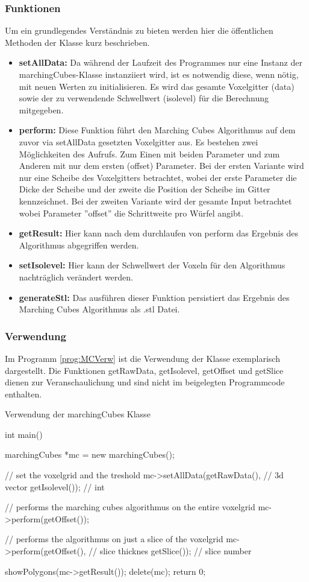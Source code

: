 \subsubsection{Funktionen}
Um ein grundlegendes Verständnis zu bieten werden hier die öffentlichen Methoden der Klasse kurz beschrieben. \\
\begin{itemize}
	\item \textbf{setAllData:} Da während der Laufzeit des Programmes nur eine Instanz der marchingCubes-Klasse instanziiert wird, ist es notwendig diese, wenn nötig, mit neuen Werten zu initialisieren. Es wird das gesamte Voxelgitter (data) sowie der zu verwendende Schwellwert (isolevel) für die Berechnung mitgegeben.
	\item \textbf{perform:} Diese Funktion führt den Marching Cubes Algorithmus auf dem zuvor via setAllData gesetzten Voxelgitter aus. Es bestehen zwei Möglichkeiten des Aufrufs. Zum Einen mit beiden Parameter und zum Anderen mit nur dem ersten (offset) Parameter. Bei der ersten Variante wird nur eine Scheibe des Voxelgitters betrachtet, wobei der erste Parameter die Dicke der Scheibe und der zweite die Position der Scheibe im Gitter kennzeichnet. Bei der zweiten Variante wird der gesamte Input betrachtet wobei Parameter ''offset'' die Schrittweite pro Würfel angibt. 
	\item \textbf{getResult:} Hier kann nach dem durchlaufen von perform das Ergebnis des Algorithmus abgegriffen werden. 
	\item \textbf{setIsolevel:} Hier kann der Schwellwert der Voxeln für den Algorithmus nachträglich verändert werden.
	\item \textbf{generateStl:} Das ausführen dieser Funktion persistiert das Ergebnis des Marching Cubes Algorithmus als .stl Datei.
\end{itemize}
\subsubsection{Verwendung}
Im Programm \ref{prog:MCVerw} ist die Verwendung der Klasse exemplarisch dargestellt. Die Funktionen getRawData, getIsolevel, getOffset und getSlice dienen zur Veranschaulichung und sind nicht im beigelegten Programmcode enthalten. 
\begin{program}[H]
	\caption{Verwendung der marchingCubes Klasse}
	\label{prog:MCVerw}
	\begin{CCode}
		int main(){
			marchingCubes *mc = new marchingCubes();
			
			// set the voxelgrid and the treshold
			mc->setAllData(getRawData(),   // 3d vector  
						   getIsolevel()); // int
			
			// performs the marching cubes algorithmus on the entire voxelgrid
			mc->perform(getOffset()); 
			
			// performs the algorithmus on just a slice of the voxelgrid 
			mc->perform(getOffset(), // slice thicknes 
						getSlice()); // slice number
			
			showPolygons(mc->getResult()); 
			delete(mc);
			return 0;	
		}
	\end{CCode}
\end{program}
